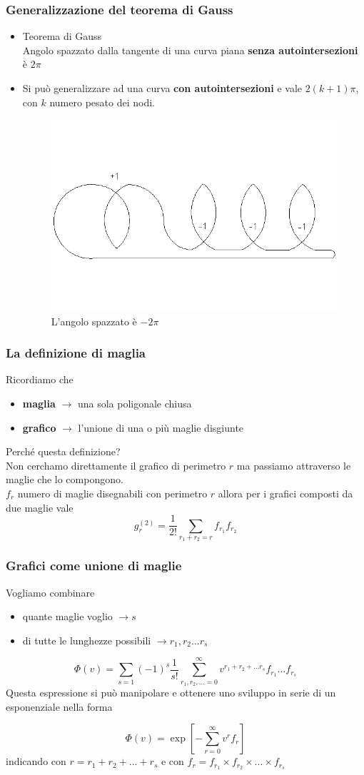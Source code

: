 \documentclass[11pt]{beamer}
\begin{document}
\begin{frame}
\frametitle{Generalizzazione del teorema di Gauss}
\begin{itemize}
\item<1->{Teorema di Gauss\\
Angolo spazzato dalla tangente di una curva piana \textbf{senza autointersezioni} è $2\pi$}
\item<2->{Si può generalizzare ad una curva \textbf{con autointersezioni} e vale $2(k+1)\pi$, con $k$ numero pesato dei nodi.
\begin{figure}[r]
	\centering
	\includegraphics[width=0.7\columnwidth]{curva}
	\caption{L'angolo spazzato è $-2\pi$}
	\label{fig1}
	\end{figure}}
	\end{itemize}
\end{frame}
\begin{frame}
\frametitle{La definizione di maglia}
Ricordiamo che
\begin{itemize} 
\item{\textbf{maglia} $\to$ una sola poligonale chiusa}
\item{\textbf{grafico} $\to$ l'unione di una o più maglie disgiunte}
\end{itemize}
Perché questa definizione?\\
Non cerchamo direttamente il grafico di perimetro $r$ ma passiamo attraverso le maglie che lo compongono.\\
$f_r$ numero di maglie disegnabili con perimetro $r$ allora per i grafici composti da due maglie vale
$$g_r^{(2)}=\frac{1}{2!}\sum_{r_1+r_2=r}f_{r_1}f_{r_2}$$
\end{frame}
\begin{frame}
\frametitle{Grafici come unione di maglie}
Vogliamo combinare
\begin{itemize}
\item{quante maglie voglio $\to s$}
\item{di tutte le lunghezze possibili $\to r_1, r_2... r_s$}
\end{itemize}
$$
\Phi(v)=\sum_{s=1}(-1)^s\frac{1}{s!}\sum_{r_1,r_2,...=0}^\infty v^{r_1+r_2+...r_s}f_{r_1}...f_{r_s}
$$
Questa espressione si può manipolare e ottenere uno sviluppo in serie di un esponenziale nella forma

$$ \Phi(v)= \exp \left[ - \sum_{r=0}^\infty v^r f_r \right] $$
indicando con $r=r_1+r_2+...+r_s$ e con $f_r=f_{r_1}\times f_{r_2}\times...\times f_{r_s}$\\
\end{frame}
\end{document}
